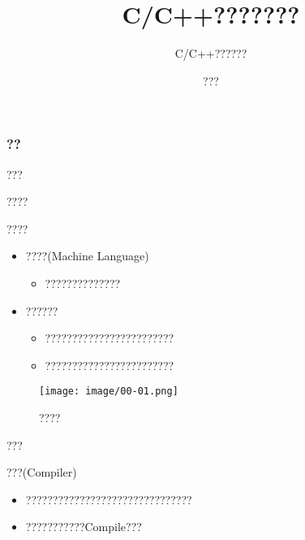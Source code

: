 \documentclass[pdf,15pt]{beamer}
\title{C/C++???????}
\subtitle{C/C++??????}
\author{???}
\begin{document}
\begin{frame}
	\titlepage
\end{frame}

\begin{frame}
\frametitle{??} %
\tableofcontents %
\end{frame}

\begin{section}{???}
\begin{subsection}{????}
\begin{frame}{????}
	\begin{itemize}
	\item ????(Machine Language)
		\begin{itemize}
		\item ??????????????
		\end{itemize}
	\item ??????
		\begin{itemize}
		\item ????????????????????????
		\item ????????????????????????
		\end{itemize}
	\end{itemize}
	\begin{figure}[h!]
		\texttt{[image: image/00-01.png]} 
		\caption{????}
	\end{figure}
\end{frame}
\end{subsection}

\begin{subsection}{???}
\begin{frame}{???(Compiler)}
	\begin{itemize}
		\item ???????????????????????????????
		\item ???????????Compile???
	\end{itemize}
	
\end{frame}
\end{subsection}


\end{section}
\end{document}
